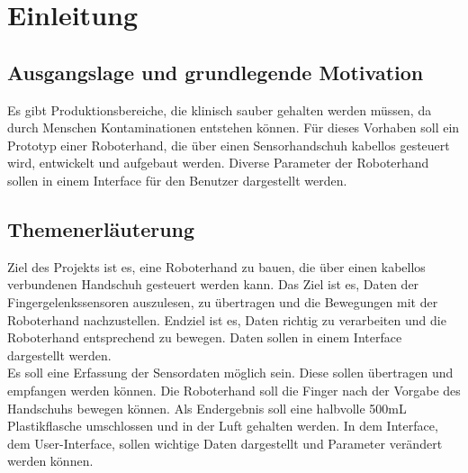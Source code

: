 \documentclass[11pt]{article}
\begin{document}
\pagebreak


\tableofcontents


\newpage
{}

\section{Einleitung}
\subsection{Ausgangslage und grundlegende Motivation}
Es gibt Produktionsbereiche, die klinisch sauber gehalten werden müssen, da durch Menschen Kontaminationen entstehen
können. Für dieses Vorhaben soll ein Prototyp einer Roboterhand, die über einen Sensorhandschuh kabellos gesteuert wird,
entwickelt und aufgebaut werden. Diverse Parameter der Roboterhand sollen in einem Interface für den Benutzer 
dargestellt werden. \\

\subsection{Themenerläuterung}
Ziel des Projekts ist es, eine Roboterhand zu bauen, die über einen kabellos verbundenen
Handschuh gesteuert werden kann. Das Ziel ist es, Daten der Fingergelenkssensoren auszulesen,
zu übertragen und die Bewegungen mit der Roboterhand nachzustellen. Endziel ist es, Daten
richtig zu verarbeiten und die Roboterhand entsprechend zu bewegen. Daten sollen in einem
Interface dargestellt werden. \\

Es soll eine Erfassung der Sensordaten möglich sein. Diese sollen übertragen und empfangen
werden können. Die Roboterhand soll die Finger nach der Vorgabe des Handschuhs bewegen
können. Als Endergebnis soll eine halbvolle 500mL Plastikflasche umschlossen und in der Luft
gehalten werden. In dem Interface, dem User-Interface, sollen wichtige Daten dargestellt und
Parameter verändert werden können. \\
\end{document}
